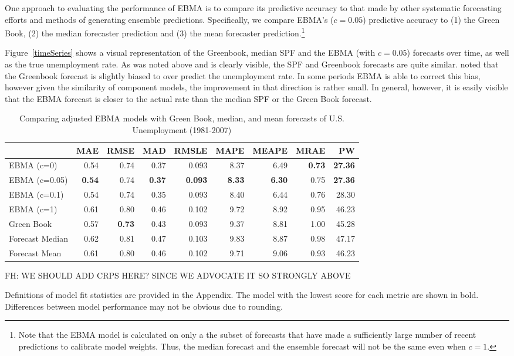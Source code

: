 \documentclass[12pt,fullpage,endnotes]{article}
\begin{document}
One approach to evaluating the performance of EBMA is to compare its
predictive accuracy to that made by other systematic forecasting
efforts and methods of generating ensemble predictions.  Specifically,
we compare EBMA's ($c=0.05$) predictive accuracy to (1) the Green
Book, (2) the median forecaster prediction and (3) the mean forecaster
prediction.\footnote{Note that the EBMA model is calculated on only a
  the subset of forecasts that have made a sufficiently large number
  of recent predictions to calibrate model weights.  Thus, the median
  forecast and the ensemble forecast will not be the same even when
  $c=1$.} 

Figure~\ref{timeSeries} shows a visual representation of the
Greenbook, median SPF and the EBMA (with $c=0.05$) forecasts over
time, as well as the true unemployment rate. As was noted above and is
clearly visible, the SPF and Greenbook forecasts are quite
similar. \citet{Baghestani:2008} noted that the Greenbook forecast is
slightly biased to over predict the unemployment rate. In some periods
EBMA is able to correct this bias, however given the similarity of
component models, the improvement in that direction is rather
small. In general, however, it is easily visible that the EBMA
forecast is closer to the actual rate than the median SPF or the Green
Book forecast.

\begin{table}[h]
\caption{Comparing adjusted EBMA models with Green Book, median, and mean forecasts of U.S. Unemployment (1981-2007)}
\begin{center}
\begin{tabular}{lrrrrrrrr}
\toprule
 & MAE & RMSE & MAD & RMSLE & MAPE & MEAPE & MRAE & PW \\ 
\midrule
 EBMA (c=0)& 0.54 & 0.74 & 0.37 & 0.093 & 8.37 & 6.49 & \textbf{0.73} & \textbf{27.36} \\ 
  EBMA (c=0.05)& \textbf{0.54} & 0.74 &\textbf{ 0.37} & \textbf{0.093} & \textbf{8.33} & \textbf{6.30} & 0.75 & \textbf{27.36} \\ 
 EBMA (c=0.1)& 0.54 & 0.74 & 0.35 & 0.093 & 8.40 & 6.44 & 0.76 & 28.30 \\ 
EBMA (c=1) & 0.61 & 0.80 & 0.46 & 0.102 & 9.72 & 8.92 & 0.95 & 46.23 \\ 
 Green Book& 0.57 & \textbf{0.73} & 0.43 & 0.093 & 9.37 & 8.81 & 1.00 & 45.28 \\ 
 Forecast Median& 0.62 & 0.81 & 0.47 & 0.103 & 9.83 & 8.87 & 0.98 & 47.17 \\ 
Forecast Mean& 0.61 & 0.80 & 0.46 & 0.102 & 9.71 & 9.06 & 0.93 & 46.23 \\ 
\bottomrule
\end{tabular}
\end{center}

FH: WE SHOULD ADD CRPS HERE? SINCE WE ADVOCATE IT SO STRONGLY ABOVE

\label{compareTable1}
Definitions of model fit statistics are provided in the Appendix. The model with the lowest score for each metric are shown in bold.  Differences between model performance may not be obvious due to rounding.
\end{table}
\end{document}
